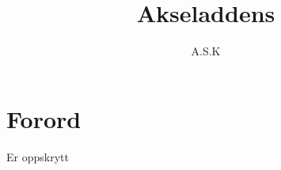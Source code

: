 \documentclass[norsk,10pt,twoside]{book}
\author{A.S.K}
\title{Akseladdens}
\date{}
\begin{document}
\pagestyle{empty} %
\chapter*{Forord}
Er oppskrytt



%




\end{document}
